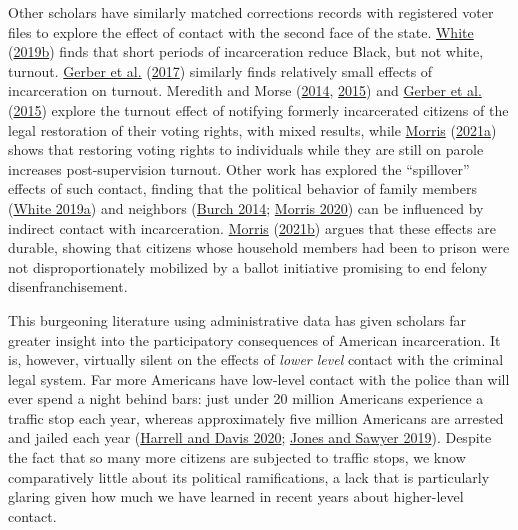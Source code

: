 \documentclass[
  12pt,
]{article}
\begin{document}
Other scholars have similarly matched corrections records with registered voter files to explore the effect of contact with the second face of the state. \protect\hyperlink{ref-White2019a}{White} (\protect\hyperlink{ref-White2019a}{2019b}) finds that short periods of incarceration reduce Black, but not white, turnout. \protect\hyperlink{ref-Gerber2017}{Gerber et al.} (\protect\hyperlink{ref-Gerber2017}{2017}) similarly finds relatively small effects of incarceration on turnout. Meredith and Morse (\protect\hyperlink{ref-Meredith2014}{2014}, \protect\hyperlink{ref-Meredith2015}{2015}) and \protect\hyperlink{ref-Gerber2015}{Gerber et al.} (\protect\hyperlink{ref-Gerber2015}{2015}) explore the turnout effect of notifying formerly incarcerated citizens of the legal restoration of their voting rights, with mixed results, while \protect\hyperlink{ref-Morris2021a}{Morris} (\protect\hyperlink{ref-Morris2021a}{2021a}) shows that restoring voting rights to individuals while they are still on parole increases post-supervision turnout. Other work has explored the ``spillover'' effects of such contact, finding that the political behavior of family members (\protect\hyperlink{ref-White2019}{White 2019a}) and neighbors (\protect\hyperlink{ref-Burch2014}{Burch 2014}; \protect\hyperlink{ref-Morris2020}{Morris 2020}) can be influenced by indirect contact with incarceration. \protect\hyperlink{ref-Morris2021}{Morris} (\protect\hyperlink{ref-Morris2021}{2021b}) argues that these effects are durable, showing that citizens whose household members had been to prison were not disproportionately mobilized by a ballot initiative promising to end felony disenfranchisement.

This burgeoning literature using administrative data has given scholars far greater insight into the participatory consequences of American incarceration. It is, however, virtually silent on the effects of \emph{lower level} contact with the criminal legal system. Far more Americans have low-level contact with the police than will ever spend a night behind bars: just under 20 million Americans experience a traffic stop each year, whereas approximately five million Americans are arrested and jailed each year (\protect\hyperlink{ref-Harrell2020}{Harrell and Davis 2020}; \protect\hyperlink{ref-Jones2019}{Jones and Sawyer 2019}). Despite the fact that so many more citizens are subjected to traffic stops, we know comparatively little about its political ramifications, a lack that is particularly glaring given how much we have learned in recent years about higher-level contact.
\end{document}
